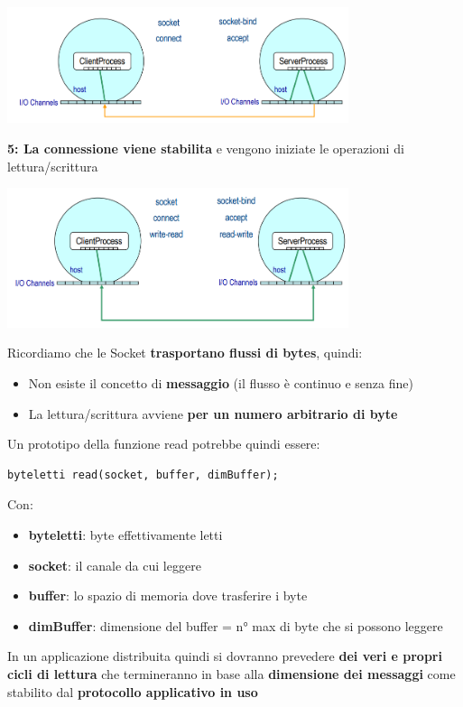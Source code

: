 \documentclass[12pt]{article}
\newenvironment{para}{\begin{adjustwidth}{13mm}{}}{\end{adjustwidth}}
\begin{document}
\begin{center}
    \includegraphics[width = 0.75\textwidth]{Images/29.PNG}
\end{center}
\textbf{5: La connessione viene stabilita} e vengono iniziate le operazioni di lettura/scrittura
\begin{center}
    \includegraphics[width = 0.75\textwidth]{Images/30.PNG}
\end{center}
Ricordiamo che le Socket \textbf{trasportano flussi di bytes}, quindi:
\begin{itemize}
    \item Non esiste il concetto di \textbf{messaggio} (il flusso è continuo e senza fine)
    \item La lettura/scrittura avviene \textbf{per un numero arbitrario di byte}
\end{itemize}
Un prototipo della funzione read potrebbe quindi essere:
\begin{para}
    \begin{lstlisting}
byteletti read(socket, buffer, dimBuffer);
\end{lstlisting}
\end{para}
Con:
\begin{itemize}
    \item \textbf{byteletti}: byte effettivamente letti
    \item \textbf{socket}: il canale da cui leggere
    \item \textbf{buffer}: lo spazio di memoria dove trasferire i byte
    \item \textbf{dimBuffer}: dimensione del buffer = n° max di byte che si possono leggere
\end{itemize}
In un applicazione distribuita quindi si dovranno prevedere \textbf{dei veri e propri cicli di lettura} che termineranno in base alla \textbf{dimensione dei messaggi} come stabilito dal \textbf{protocollo applicativo in uso}
\end{document}
